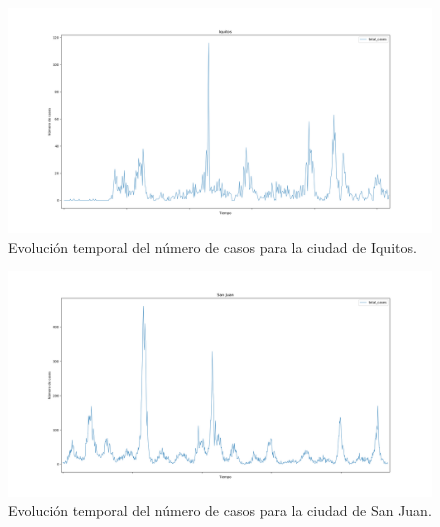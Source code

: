 \documentclass[acmtog, screen]{acmart}
\begin{document}
\begin{figure}[h]
	\includegraphics[width=\columnwidth]{casosIquitos}
	\caption{Evolución temporal del número de casos para la ciudad de Iquitos.}
	\label{fig:casosIquitos}
\end{figure}
\begin{figure}[h]
	\includegraphics[width=\columnwidth]{casosSanJuan}
	\caption{Evolución temporal del número de casos para la ciudad de San Juan.}
	\label{fig:casosSanJuan}
\end{figure}
\end{document}
